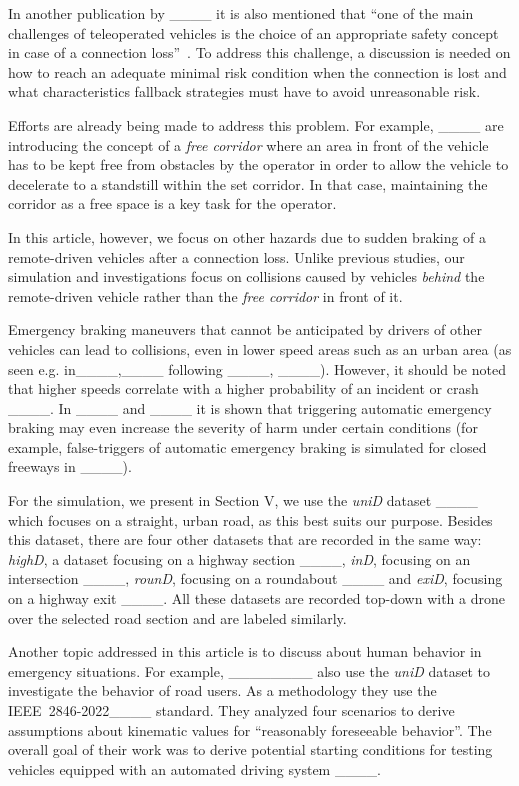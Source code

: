 In another publication by ____ it is also mentioned that ``one of the main challenges of teleoperated vehicles is the choice of an appropriate safety concept in case of a connection loss''~\cite[1399]{Tang2014}.
To address this challenge, a discussion is needed on how to reach an adequate minimal risk condition when the connection is lost and what characteristics fallback strategies must have to avoid unreasonable risk.


Efforts are already being made to address this problem. For example, ____ are introducing the concept of a \emph{free corridor} where an area in front of the vehicle has to be kept free from obstacles by the operator in order to allow the vehicle to decelerate to a standstill within the set corridor.
In that case, maintaining the corridor as a free space is a key task for the operator.

In this article, however, we focus on other hazards due to sudden braking of a remote-driven vehicles after a connection loss.
Unlike previous studies, our simulation and investigations focus on collisions caused by vehicles \emph{behind} the remote-driven vehicle rather than the \emph{free corridor} in front of it.


Emergency braking maneuvers that cannot be anticipated by drivers of other vehicles can lead to collisions, even in lower speed areas such as an urban area (as seen e.g. in____,____ following ____, ____). However, it should be noted that higher speeds correlate with a higher probability of an incident or crash ____.
In ____ and ____ it is shown that triggering automatic emergency braking may even increase the severity of harm under certain conditions (for example, false-triggers of automatic emergency braking is simulated for closed freeways in ____).

For the simulation, we present in Section V, we use the \emph{uniD} dataset ____ which focuses on a straight, urban road, as this best suits our purpose. 
Besides this dataset, there are four other datasets that are recorded in the same way: \emph{highD}, a dataset focusing on a highway section ____, \emph{inD}, focusing on an intersection ____, \emph{rounD}, focusing on a roundabout ____ and \emph{exiD}, focusing on a highway exit ____.
All these datasets are recorded top-down with a drone over the selected road section and are labeled similarly. 

Another topic addressed in this article is to discuss about human behavior in emergency situations. 
For example, ________ also use the \emph{uniD} dataset to investigate the behavior of road users. 
As a methodology they use the \mbox{IEEE 2846-2022____} standard. 
They analyzed four scenarios to derive assumptions about kinematic values for ``reasonably foreseeable behavior''. 
The overall goal of their work was to derive potential starting conditions for testing vehicles equipped with an automated driving system ____.

